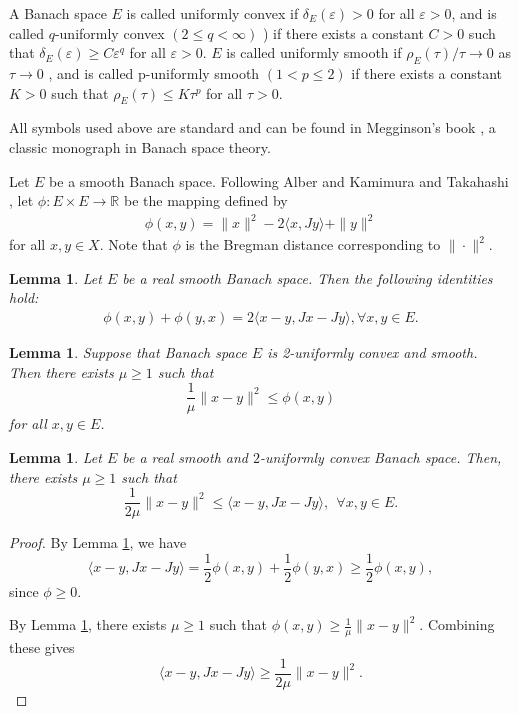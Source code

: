 \documentclass[12pt,a4paper]{amsart}
\newtheorem{lemma}[theorem]{Lemma}
\theoremstyle{definition}
\numberwithin{equation}{section}
\begin{document}
A Banach space $E$ is called uniformly convex if \(\delta_{E}(\varepsilon)>0\) for all \(\varepsilon>0\), and is called $q$-uniformly convex \((2 \leq q<\infty)\) ) if there exists a constant \(C>0\) such that \(\delta_{E}(\varepsilon) \geq C \varepsilon^{q}\) for all \(\varepsilon>0\). $E$ is called uniformly smooth if \(\rho_{E}(\tau) / \tau \to 0\) as \(\tau \to 0\) , and is called p-uniformly smooth \((1<p \leq 2)\) if there exists a constant \(K>0\) such that \(\rho_{E}(\tau) \leq K \tau^{p}\) for all \(\tau>0\).



All symbols used above are standard and can be found in Megginson's book \cite{MRE} , a classic monograph in Banach space theory.




Let $E$ be a smooth Banach space. Following Alber \cite{AY} and Kamimura and Takahashi \cite{KT2}, let \(\phi: E \times E \to \mathbb{R}\) be the mapping defined by
\begin{align}\label{phi}
  \phi(x, y)=\| x\|^{2} - 2\langle x, Jy\rangle + \| y\|^{2}
\end{align}
for all \(x, y \in X\). Note that $\phi$ is the Bregman distance corresponding to \(\|\cdot\|^{2}\).

\begin{lemma}\label{phiequ}\cite{AY,AK}
  Let $E$ be a real smooth Banach space. Then the following identities hold:
   \begin{align}
     \phi(x,y) + \phi(y,x) = 2\langle x-y, Jx-Jy\rangle, \forall x,y\in E.
   \end{align}
\end{lemma}

\begin{lemma}\label{phiinequ1}\cite{AK}
  Suppose that Banach space $E$ is 2-uniformly convex and smooth. Then there exists $\mu \geq 1$ such that
\[\frac{1}{\mu}\| x-y\|^{2} \leq \phi(x, y) \]
for all \(x, y \in E\).
\end{lemma}

\begin{lemma}\label{main inequa1}
  Let $E$ be a real smooth and $2$-uniformly convex Banach space. Then, there exists \(\mu \geq 1\) such that
\[\frac{1}{2\mu}\| x-y\| ^{2} \leq \langle x-y, Jx-Jy \rangle,~~ \forall x, y \in E .\]
\end{lemma}
\begin{proof}
By Lemma \ref{phiequ}, we have
\[
\langle x - y, Jx - Jy \rangle = \frac{1}{2}\phi(x,y) + \frac{1}{2}\phi(y,x) \geq \frac{1}{2}\phi(x,y),
\]
since \( \phi \geq 0 \).

By Lemma \ref{phiinequ1}, there exists \( \mu \geq 1 \) such that \( \phi(x,y) \geq \frac{1}{\mu}\|x - y\|^2 \). Combining these gives
\[
\langle x - y, Jx - Jy \rangle \geq \frac{1}{2\mu}\|x - y\|^2.
\]
\end{proof}
\end{document}
